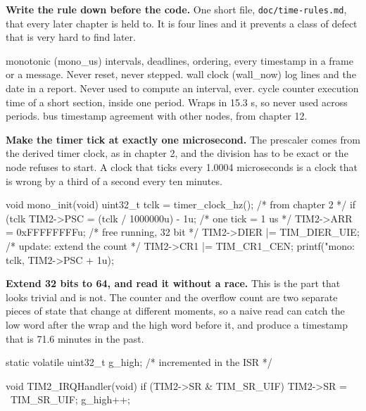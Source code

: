 \begin{steps}
\item \textbf{Write the rule down before the code.} One short file,
\texttt{doc/time-rules.md}, that every later chapter is held to. It is four
lines and it prevents a class of defect that is very hard to find later.
\begin{plaincode}
monotonic (mono_us)   intervals, deadlines, ordering, every timestamp in a
                      frame or a message. Never reset, never stepped.
wall clock (wall_now)  log lines and the date in a report. Never used to
                      compute an interval, ever.
cycle counter          execution time of a short section, inside one period.
                       Wraps in 15.3 s, so never used across periods.
bus timestamp          agreement with other nodes, from chapter 12.
\end{plaincode}

\item \textbf{Make the timer tick at exactly one microsecond.} The prescaler
comes from the derived timer clock, as in chapter 2, and the division has to be
exact or the node refuses to start. A clock that ticks every 1.0004 microseconds
is a clock that is wrong by a third of a second every ten minutes.
\begin{ccode}
void mono_init(void)
{
    uint32_t tclk = timer_clock_hz();            /* from chapter 2 */
    if (tclk %
    TIM2->PSC = (tclk / 1000000u) - 1u;          /* one tick = 1 us */
    TIM2->ARR = 0xFFFFFFFFu;                     /* free running, 32 bit */
    TIM2->DIER |= TIM_DIER_UIE;                  /* update: extend the count */
    TIM2->CR1 |= TIM_CR1_CEN;
    printf("mono: %
           tclk, TIM2->PSC + 1u);
}
\end{ccode}

\item \textbf{Extend 32 bits to 64, and read it without a race.} This is the
part that looks trivial and is not. The counter and the overflow count are two
separate pieces of state that change at different moments, so a naive read can
catch the low word after the wrap and the high word before it, and produce a
timestamp that is 71.6 minutes in the past.
\begin{ccode}
static volatile uint32_t g_high;                 /* incremented in the ISR */

void TIM2_IRQHandler(void)
{
    if (TIM2->SR & TIM_SR_UIF) { TIM2->SR = ~TIM_SR_UIF; g_high++; }
}


\end{ccode}
\end{steps}
